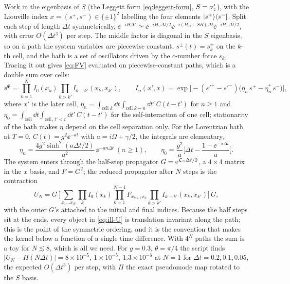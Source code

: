 Work in the eigenbasis of $S$ (the Leggett form \eqref{eq:leggett-form}, $S=\sigma_z'$), with the Liouville index $x=(s^+,s^-)\in\{\pm1\}^2$ labelling the four elements $|s^+\rangle\langle s^-|$.
Split each step of length $\Delta t$ symmetrically, $\ee^{-iH\Delta t}\simeq\ee^{-iH_S\Delta t/2}\ee^{-i(H_B+S B)\Delta t}\ee^{-iH_S\Delta t/2}$, with error $O(\Delta t^3)$ per step.
The middle factor is diagonal in the $S$ eigenbasis, so on a path the system variables are piecewise constant, $s^\pm(t)=s^\pm_k$ on the $k$-th cell, and the bath is a set of oscillators driven by the c-number force $s_k$.
Tracing it out gives \cref{eq:FV} evaluated on piecewise-constant paths, which is a double sum over cells:
\begin{equation}
  \ee^{\Phi}=\prod_{k=1}^{N}I_0(x_k)\prod_{k>k'}I_{k-k'}(x_k,x_{k'}),\qquad
  I_n(x',x)=\exp\!\big[-(s'^+-s'^-)\big(\eta_n\,s^+-\eta_n^*\,s^-\big)\big],
  \label{eq:ill-I}
\end{equation}
where $x'$ is the later cell, $\eta_n=\int_{\text{cell }k}\!\dd t\int_{\text{cell }k-n}\!\dd t'\,C(t-t')$ for $n\ge1$ and $\eta_0=\int_{\text{cell}}\dd t\int_{\text{cell},\,t'<t}\dd t'\,C(t-t')$ for the self-interaction of one cell; stationarity of the bath makes $\eta$ depend on the cell separation only.
For the Lorentzian bath at $T=0$, $C(t)=g^2\ee^{-at}$ with $a=i\Omega+\gamma/2$, the integrals are elementary,
\begin{equation}
  \eta_n=\frac{4g^2\sinh^2(a\Delta t/2)}{a^2}\,\ee^{-an\Delta t}\ (n\ge1),\qquad
  \eta_0=\frac{g^2}{a}\Big[\Delta t-\frac{1-\ee^{-a\Delta t}}{a}\Big].
  \label{eq:ill-eta}
\end{equation}
The system enters through the half-step propagator $G=\mathrm{e}^{\mathcal{L}_S\Delta t/2}$, a $4\times4$ matrix in the $x$ basis, and $F=G^2$; the reduced propagator after $N$ steps is the contraction
\begin{equation}
  U_N=G\,\Big[\sum_{x_1\dots x_N}\prod_{k}I_0(x_k)\prod_{k=1}^{N-1}F_{x_{k+1}x_k}\prod_{k>k'}I_{k-k'}(x_k,x_{k'})\Big]\,G,
  \label{eq:ill-U}
\end{equation}
with the outer $G$'s attached to the initial and final indices.
Because the half steps sit at the ends, every object in \cref{eq:ill-U} is translation invariant along the path; this is the point of the symmetric ordering, and it is the convention that makes the kernel below a function of a single time difference.
With $4^N$ paths the sum is a toy for $N\lesssim8$, which is all we need.
For $g=0.3$, $\theta=\pi/4$ the script finds $|U_N-\Pi(N\Delta t)|=8\times10^{-5},\ 1\times10^{-5},\ 1.3\times10^{-6}$ at $N=1$ for $\Delta t=0.2,0.1,0.05$, the expected $O(\Delta t^3)$ per step, with $\Pi$ the exact pseudomode map rotated to the $S$ basis.

